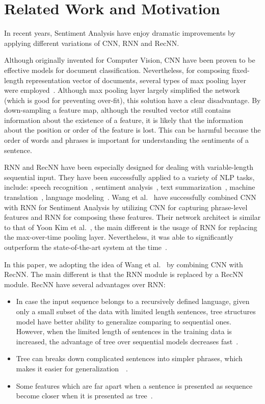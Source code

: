 \section{Related Work and Motivation}\label{sec:related}
In recent years, Sentiment Analysis have enjoy dramatic improvements by applying different variations of CNN, RNN and RecNN. 

Although originally invented for Computer Vision, CNN have been proven to be effective models for document classification.
Nevertheless, for composing fixed-length representation vector of documents, several types of max pooling layer were employed~\cite{nlp-scratch, KimCNN, DCNN, 2-layer-cnn}.
Although max pooling layer largely simplified the network (which is good for preventing over-fit), this solution have a clear disadvantage.
By down-sampling a feature map, although the resulted vector still contains information about the existence of a feature, it is likely that the information about the position or order of the feature is lost.
This can be harmful because the order of words and phrases is important for understanding the sentiments of a sentence.

RNN and RecNN have been especially designed for dealing with variable-length sequential input. 
They have been successfully applied to a variety of NLP tasks, include: speech recognition~\cite{speech-lstm, MiaoGM15}, sentiment analysis~\cite{treeLSTM, attention-gru}, text summarization~\cite{RushCW15, NallapatiXZ16}, machine translation~\cite{FiratCB16, SutskeverVL14, BritzGLL17}, language modeling~\cite{mikolov-nlm, JozefowiczVSSW16}.
Wang et al.~\cite{cnn-rnn} have successfully combined CNN with RNN for Sentiment Analysis by utilizing CNN for capturing phrase-level features and RNN for composing these features.
Their network architect is similar to that of Yoon Kim et al.~\cite{KimCNN}, the main different is the usage of RNN for replacing the max-over-time pooling layer.
Nevertheless, it was able to significantly outperform the state-of-the-art system at the time~\cite{cnn-rnn}.

In this paper, we adopting the idea of Wang et al.~\cite{cnn-rnn} by combining CNN with RecNN.
The main different is that the RNN module is replaced by a RecNN module.
RecNN have several advantages over RNN:
\begin{itemize}
	\item In case the input sequence belongs to a recursively defined language, given only a small subset of the data with limited length sentences, tree structures model have better ability to generalize comparing to sequential ones.
	However, when the limited length of sentences in the training data is increased, the advantage of tree over sequential models decreases fast~\cite{bowman-treevslstm}.
	\item Tree can breaks down complicated sentences into simpler phrases, which makes it easier for generalization~\cite{knowledge-matter}~\cite{need-tree}.
	\item Some features which are far apart when a sentence is presented as sequence become closer when it is presented as tree~\cite{need-tree}.
\end{itemize}

